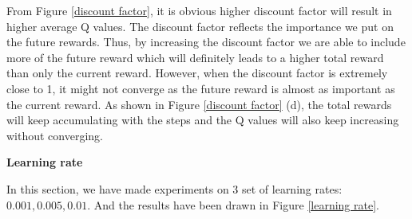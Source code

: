 \documentclass{article}
\begin{document}
From Figure \ref{discount factor}, it is obvious higher discount factor will result in higher average Q
values. The discount factor reflects the importance we put on the future rewards. Thus, by increasing
the discount factor we are able to include more of the future reward which will definitely leads to a
higher total reward than only the current reward. However, when the discount factor is extremely close
to 1, it might not converge as the future reward is almost as important as the current reward. As shown
in Figure \ref{discount factor} (d), the total rewards will keep accumulating with the steps and the Q values
will also keep increasing without converging.

\textbf{Learning rate}

In this section, we have made experiments on 3 set of learning rates: $0.001,0.005,0.01$.
And the results have been drawn in Figure \ref{learning rate}.
\end{document}
